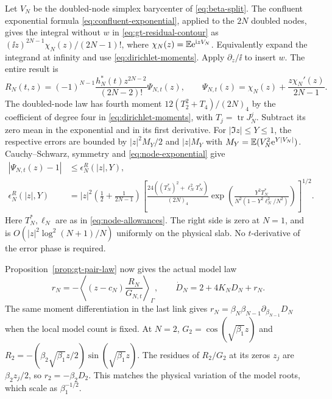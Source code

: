 Let \(V_N\) be the doubled-node simplex barycenter of
\eqref{eq:beta-split}. The confluent exponential formula
\eqref{eq:confluent-exponential}, applied to the \(2N\) doubled
nodes, gives the integral without \(w\) in
\eqref{eq:gt-residual-contour} as
\((\ii z)^{2N-1}\chi_N(z)/(2N-1)!\), where
\(\chi_N(z)=\mathbb E\mathrm e^{\mathrm i zV_N}\). Equivalently expand the
integrand at infinity and use \eqref{eq:dirichlet-moments}.
Apply \(\partial_z/\ii\) to insert \(w\). The entire result is
\begin{equation}
 R_N(t,z)=(-1)^{N-1}\frac{h_N^*(t)z^{2N-2}}{(2N-2)!}\Psi_{N,t}(z),
 \qquad \Psi_{N,t}(z)=\chi_N(z)+\frac{z\chi_N'(z)}{2N-1}.
 \label{eq:gt-residual-phase}
\end{equation}
The doubled-node law has fourth moment
\(12(T_2^2+T_4)/(2N)_4\) by the coefficient of degree four in
\eqref{eq:dirichlet-moments}, with \(T_j=\operatorname{tr}J_N^j\).
Subtract its zero mean in the exponential and in its first
derivative. For \(|\Im z|\le Y\le1\), the respective errors are
bounded by \(|z|^2 M_Y/2\) and \(|z|M_Y\) with
\(M_Y=\mathbb E(V_N^2\mathrm e^{Y|V_N|})\).
Cauchy--Schwarz, symmetry and \eqref{eq:node-exponential} give
\begin{equation}
 \begin{aligned}
 |\Psi_{N,t}(z)-1|&\le\epsilon_N^R(|z|,Y),\\
 \epsilon_N^R(|z|,Y)&=
 |z|^2\left(\frac12+\frac1{2N-1}\right)
 \left[
 \frac{24((T_N^*)^2+\ell_N^2T_N^*)}{(2N)_4}
 \exp\!\left(\frac{Y^2T_N^*}{N^2(1-Y^2\ell_N^2/N^2)}\right)
 \right]^{1/2}.
 \end{aligned}
 \label{eq:gt-residual-phase-bound}
\end{equation}
Here \(T_N^*,\ell_N\) are as in \eqref{eq:node-allowances}.
The right side is zero at \(N=1\), and is
\(O(|z|^2\log^2(N+1)/N)\) uniformly on the physical slab.
No \(t\)-derivative of the error phase is required.

Proposition~\ref{prop:gt-pair-law} now gives the actual model law
\begin{equation}
 r_N=-\left\langle(z-c_N)\frac{R_N}{G_{N,t}}\right\rangle_\Gamma,
 \qquad \dot D_N=2+4K_ND_N+r_N .
 \label{eq:gt-model-gap}
\end{equation}
The same moment differentiation in the last link gives
\(r_N=\beta_N\beta_{N-1}\partial_{\beta_{N-1}}D_N\) when the
local model count is fixed. At \(N=2\), \(G_2=\cos(\sqrt{\beta_1}z)\)
and \(R_2=-(\beta_2\sqrt{\beta_1}z/2)\sin(\sqrt{\beta_1}z)\).
The residues of \(R_2/G_2\) at its zeros \(z_j\) are \(\beta_2z_j/2\),
so \(r_2=-\beta_2D_2\). This matches the physical variation of the
model roots, which scale as \(\beta_1^{-1/2}\).

